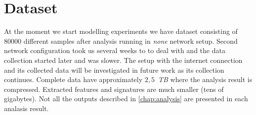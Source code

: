 \section{Dataset}
At the moment we start modelling experiments we have dataset consisting of $80000$ different samples after analysis running in \emph{none} network setup. Second network configuration took us several weeks to to deal with and the data collection started later and was slower. The setup with the internet connection and its collected data will be investigated in future work as its collection continues. Complete data have approximately $2,5$~\emph{TB} where the analysis result is compressed. Extracted features and signatures are much smaller (tens of gigabytes). Not all the outputs described in \ref{chap:analysis} are presented in each analasis result.








